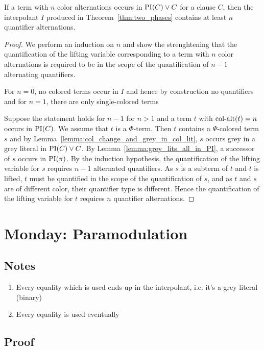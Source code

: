 \documentclass[,%
	draft=false,%
	numbers=noendperiod
	12pt,
	a4paper,
	oneside,%
	openany,
]{memoir}
\begin{document}
\begin{prop}
	If a term with $n$ color alternations occurs in $\operatorname{PI}(C) \lor C$ for a clause $C$, then the interpolant $I$ produced in Theorem~\ref{thm:two_phases} contains at least $n$ quantifier alternations.
\end{prop}
\begin{proof}
	We perform an induction on $n$
	and show the strenghtening that
	the quantification of the lifting variable corresponding to a term with $n$ color alternations is required to be in the scope of the quantification of $n-1$ alternating quantifiers.
	
	For $n=0$, no colored terms occur in $I$ and hence by construction no quantifiers
	and for $n=1$, there are only single-colored terms 

	Suppose the statement holds for $n-1$ for $n>1$ and a term $t$ with $\operatorname{col-alt}(t) = n$ occurs in $\operatorname{PI}(C)$.
	We assume that $t$ is a $\Phi$-term.
	Then $t$ contains a $\Psi$-colored term $s$ and
	by Lemma~\ref{lemma:col_change_and_grey_in_col_lit}, $s$ occurs grey in a grey literal in $\operatorname{PI}(C) \lor C$.
	By Lemma~\ref{lemma:grey_lits_all_in_PI}, a successor of $s$ occurs in $\operatorname{PI}(\pi)$.
	By the induction hypothesis, the quantification of the lifting variable for $s$ requires $n-1$ alternated quantifiers.
	As $s$ is a subterm of $t$ and $t$ is lifted, $t$ must be quantified in the scope of the quantification of $s$, and as $t$ and $s$ are of different color, their quantifier type is different. 
	Hence the quantification of the lifting variable for $t$ requires $n$ quantifier alternations.
\end{proof}

\section{Monday: Paramodulation}

\subsection{Notes}
\begin{enumerate}
	\item Every equality which is used ends up in the interpolant, i.e. it's a grey literal (binary)
	\item Every equality is used eventually
\end{enumerate}
\subsection{Proof}
\end{document}
